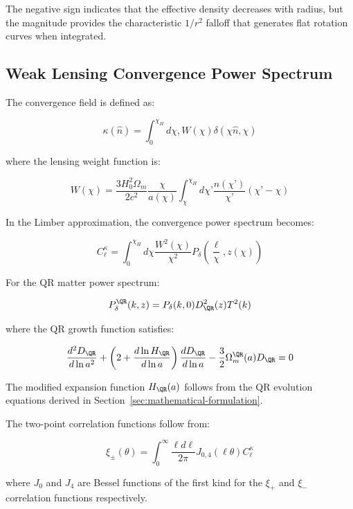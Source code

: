 The negative sign indicates that the effective density decreases with radius, but the magnitude provides the characteristic $1/r^2$ falloff that generates flat rotation curves when integrated.

\subsection{Weak Lensing Convergence Power Spectrum}
\label{subsec:lensing-convergence-derivation}

The convergence field is defined as:

\begin{equation}
\kappa(\hat{n}) = \int_0^{\chi_H} d\chi , W(\chi) \delta\left(\chi \hat{n}, \chi\right)
\label{eq:convergence-definition}
\end{equation}

where the lensing weight function is:

\begin{equation}
W(\chi) = \frac{3H_0^2 \Omega_m}{2c^2} \frac{\chi}{a(\chi)} \int_\chi^{\chi_H} d\chi’ \frac{n(\chi’)}{\chi’} (\chi’ - \chi)
\label{eq:lensing-weight-detailed}
\end{equation}

In the Limber approximation, the convergence power spectrum becomes:

\begin{equation}
C_\ell^{\kappa} = \int_0^{\chi_H} d\chi \frac{W^2(\chi)}{\chi^2} P_\delta\left(\frac{\ell}{\chi}, z(\chi)\right)
\label{eq:convergence-power-limber}
\end{equation}

For the QR matter power spectrum:

\begin{equation}
P_\delta^{\QR}(k,z) = P_\delta(k,0) D_{\QR}^2(z) T^2(k)
\label{eq:qr-matter-power}
\end{equation}

where the QR growth function satisfies:

\begin{equation}
\frac{d^2 D_{\QR}}{d \ln a^2} + \left(2 + \frac{d \ln H_{\QR}}{d \ln a}\right)\frac{d D_{\QR}}{d \ln a} - \frac{3}{2}\Omega_m^{\QR}(a) D_{\QR} = 0
\label{eq:qr-growth-equation}
\end{equation}

The modified expansion function $H_{\QR}(a)$ follows from the QR evolution equations derived in Section~\ref{sec:mathematical-formulation}.

The two-point correlation functions follow from:

\begin{equation}
\xi_\pm(\theta) = \int_0^\infty \frac{\ell d\ell}{2\pi} J_{0,4}(\ell\theta) C_\ell^{\kappa}
\label{eq:two-point-correlations-detailed}
\end{equation}

where $J_0$ and $J_4$ are Bessel functions of the first kind for the $\xi_+$ and $\xi_-$ correlation functions respectively.